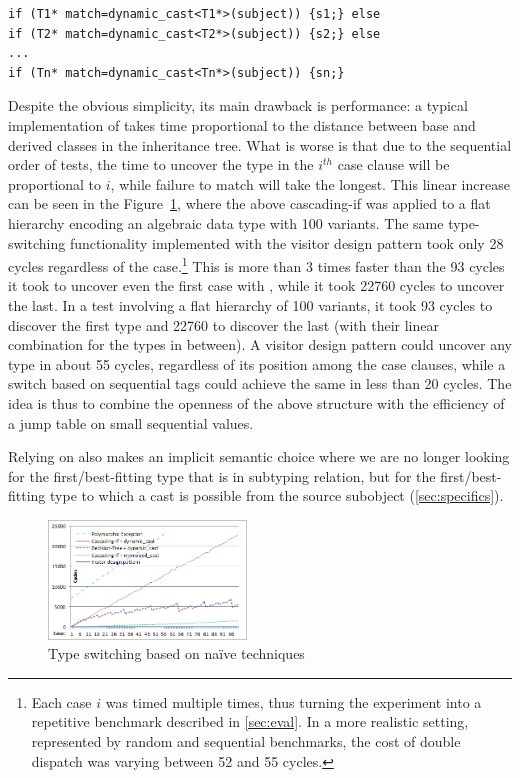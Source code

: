 \begin{lstlisting}
if (T1* match=dynamic_cast<T1*>(subject)) {s1;} else
if (T2* match=dynamic_cast<T2*>(subject)) {s2;} else
...
if (Tn* match=dynamic_cast<Tn*>(subject)) {sn;}
\end{lstlisting}

\noindent
Despite the obvious simplicity, its main drawback is performance: a typical implementation of 
 takes time proportional to the distance between base and 
derived classes in the inheritance tree. What is worse is that due to the
sequential order of tests, the time to uncover the type in the $i^{th}$ case 
clause will be proportional to $i$, while failure to match will take the longest. 
This linear increase can be seen in the Figure~\ref{fig:DCastVis1}, where 
the above cascading-if was applied to a flat hierarchy encoding an algebraic 
data type with 100 variants. The same type-switching functionality implemented 
with the visitor design pattern took only 28 cycles regardless of the 
case.\footnote{Each case $i$ was timed multiple times, thus turning the experiment 
into a repetitive benchmark described in \textsection\ref{sec:eval}. In a more
realistic setting, represented by random and sequential benchmarks, the cost of 
double dispatch was varying between 52 and 55 cycles.}
This is more than 3 times faster than the 93 cycles it took to uncover even the 
first case with , while it took 22760 cycles to uncover the 
last.
In a test involving a flat hierarchy of 100 variants, it took 93 cycles to 
discover the first type and 22760 to discover the last (with their linear combination 
for the types in between). A visitor design pattern could 
uncover any type in about 55 cycles, regardless of its position among the case 
clauses, while a switch based on sequential tags could achieve the same in less 
than 20 cycles. The idea is thus to combine the openness of the above structure 
with the efficiency of a jump table on small sequential values.

Relying on  also makes an implicit semantic choice where we 
are no longer looking for the first/best-fitting type that is in subtyping 
relation, but for the first/best-fitting type to which a cast is possible from 
the source subobject (\textsection\ref{sec:specifics}).

\begin{figure}[htbp]
  \centering
    \includegraphics[width=0.47\textwidth]{DCast-vs-Visitors1.png}
  \caption{Type switching based on na\"ive techniques}
  \label{fig:DCastVis1}
\end{figure}

